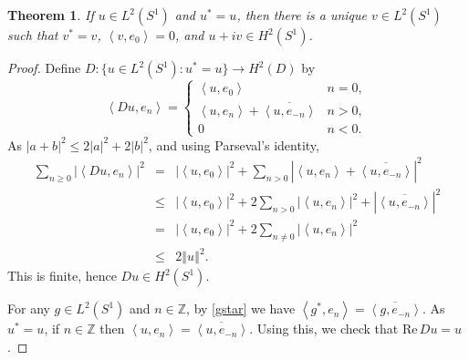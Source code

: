 \documentclass{article}
\newcommand{\inner}[2]{\left\langle #1, #2 \right\rangle}
\def\Re{\ensuremath{\mathrm{Re}}\,}
\newcommand{\norm}[1]{\left\Vert #1 \right\Vert}
\newtheorem{theorem}{Theorem}
\begin{document}
\begin{theorem}
If $u \in L^2(S^1)$ and $u^*=u$, then there is a unique $v \in L^2(S^1)$ such that $v^*=v$, $\inner{v}{e_0}=0$, and $u+iv \in H^2(S^1)$.
\end{theorem}
\begin{proof}
Define $D:\{u \in L^2(S^1): u^*=u\} \to H^2(D)$ by 
\[
\inner{Du}{e_n}=\begin{cases}
\inner{u}{e_0}&n=0,\\
\inner{u}{e_n}+\overline{\inner{u}{e_{-n}}}&n>0,\\
0&n<0.
\end{cases}
\]
As $|a+b|^2 \leq 2|a|^2  + 2|b|^2$, and using Parseval's identity,
\begin{eqnarray*}
\sum_{n \geq 0} |\inner{Du}{e_n}|^2&=&|\inner{u}{e_0}|^2 + \sum_{n>0} |\inner{u}{e_n}+\overline{\inner{u}{e_{-n}}}|^2\\
&\leq&|\inner{u}{e_0}|^2 + 2 \sum_{n>0} |\inner{u}{e_n}|^2 + |\overline{\inner{u}{e_{-n}}}|^2\\
&=&|\inner{u}{e_0}|^2 + 2\sum_{n \neq 0}  |\inner{u}{e_n}|^2\\
&\leq&2\norm{u}^2.
\end{eqnarray*}
This is finite, hence $Du \in H^2(S^1)$.

For any $g \in L^2(S^1)$ and $n \in \mathbb{Z}$, by \eqref{gstar} we have $\inner{g^*}{e_n}=\overline{\inner{g}{e_{-n}}}$. As $u^*=u$,
if $n \in \mathbb{Z}$ then $\inner{u}{e_n}=\overline{\inner{u}{e_{-n}}}$. Using this, we check that $\Re Du=u$.


\end{proof}
\end{document}
